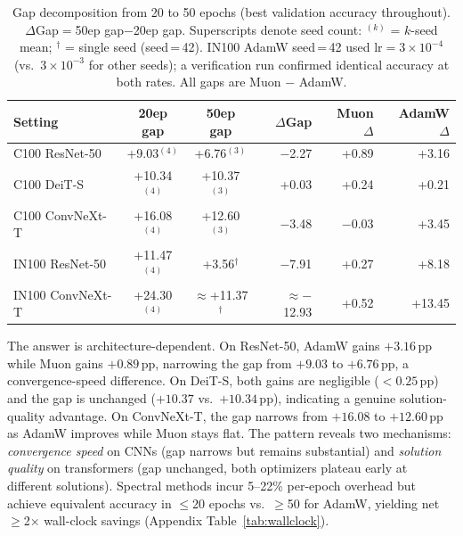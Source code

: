 \begin{table}[t]
\centering
\caption{Gap decomposition from 20 to 50 epochs (best validation accuracy throughout). $\Delta$Gap${}={}$50ep gap$-$20ep gap. Superscripts denote seed count: $^{(k)}$ = $k$-seed mean; $^\dagger$ = single seed (seed\,=\,42). IN100 AdamW seed\,=\,42 used $\text{lr}{=}3{\times}10^{-4}$ (vs.\ $3{\times}10^{-3}$ for other seeds); a verification run confirmed identical accuracy at both rates. All gaps are Muon $-$ AdamW.}
\label{tab:gap_narrowing}
\vspace{-0.5em}
\small
\footnotesize
\setlength{\tabcolsep}{3pt}
\begin{tabular}{@{}lccrrr@{}}
\toprule
Setting & 20ep gap & 50ep gap & $\Delta$Gap & Muon $\Delta$ & AdamW $\Delta$ \\
\midrule
C100 ResNet-50   & +9.03$^{(4)}$  & +6.76$^{(3)}$  & $-$2.27  & +0.89 & +3.16 \\
C100 DeiT-S      & +10.34$^{(4)}$ & +10.37$^{(3)}$ & +0.03  & +0.24 & +0.21 \\
C100 ConvNeXt-T  & +16.08$^{(4)}$ & +12.60$^{(3)}$  & $-$3.48  & $-$0.03 & +3.45 \\
IN100 ResNet-50  & +11.47$^{(4)}$ & +3.56$^\dagger$  & $-$7.91  & +0.27 & +8.18 \\
IN100 ConvNeXt-T & +24.30$^{(4)}$ & $\approx$+11.37$^\dagger$ & $\approx$$-$12.93 & +0.52 & +13.45 \\
\bottomrule
\end{tabular}
\vspace{-0.5em}
\end{table}

The answer is architecture-dependent.
On ResNet-50, AdamW gains $+3.16$\,pp while Muon gains $+0.89$\,pp, narrowing the gap from $+9.03$ to $+6.76$\,pp, a convergence-speed difference.
On DeiT-S, both gains are negligible ($<0.25$\,pp) and the gap is unchanged ($+10.37$ vs.\ $+10.34$\,pp), indicating a genuine solution-quality advantage.
On ConvNeXt-T, the gap narrows from $+16.08$ to $+12.60$\,pp as AdamW improves while Muon stays flat.
The pattern reveals two mechanisms: \emph{convergence speed} on CNNs (gap narrows but remains substantial) and \emph{solution quality} on transformers (gap unchanged, both optimizers plateau early at different solutions).
Spectral methods incur 5--22\% per-epoch overhead but achieve equivalent accuracy in $\leq$20 epochs vs.\ $\geq$50 for AdamW, yielding net $\geq$2$\times$ wall-clock savings (Appendix Table~\ref{tab:wallclock}).

\vspace{-0.5em}
